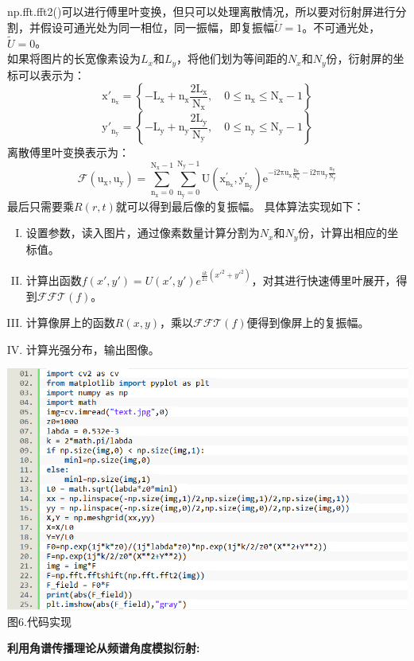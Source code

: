 \documentclass[a4paper,12pt]{article}
\begin{document}
np.fft.fft2()可以进行傅里叶变换，但只可以处理离散情况，所以要对衍射屏进行分割，并假设可通光处为同一相位，同一振幅，即复振幅$\widetilde{U}=1$。不可通光处，$\widetilde{U}=0$。\\
如果将图片的长宽像素设为$L_x$和$L_y$，将他们划为等间距的$N_x$和$N_y$份，衍射屏的坐标可以表示为：
$$\mathrm x'_\mathrm{n_x}=\left\{-\mathrm L_\mathrm{x}+\mathrm n_\mathrm{x}\dfrac{2\mathrm L_\mathrm{x}}{\mathrm N_\mathrm{x}},\quad0\le\mathrm n_\mathrm{x}\le\mathrm N_\mathrm{x}-1\right\}$$
$$\mathrm y'_\mathrm{n_y}=\left\{-\mathrm L_\mathrm{y}+\mathrm n_\mathrm{y}\dfrac{2\mathrm L_\mathrm{y}}{\mathrm N_\mathrm{y}},\quad0\le\mathrm n_\mathrm{y}\le\mathrm N_\mathrm{y}-1\right\}$$
离散傅里叶变换表示为：
$$\mathrm{\mathcal{F}(u_x,u_y)=\sum_{n_x=0}^{N_x-1}\sum_{n_y=0}^{N_y-1}U(x_{n_x}^{\prime},y_{n_y}^{\prime})e^{-i2\pi u_x\frac{n_x}{N_x}-i2\pi u_y\frac{n_y}{N_y}}}$$
最后只需要乘$R(r,t)$就可以得到最后像的复振幅。
\newpage 具体算法实现如下：
\begin{enumerate}[I.]
	\item 设置参数，读入图片，通过像素数量计算分割为$N_x$和$N_y$份，计算出相应的坐标值。
	\item 计算出函数$f(x',y')=U(x',y')e^{\frac{ik}{2z}(x'^2+y'^2)}$，对其进行快速傅里叶展开，得到$\mathcal{FFT}(f)$。
	\item 计算像屏上的函数$R(x,y)$，乘以$\mathcal{FFT}(f)$便得到像屏上的复振幅。
	\item 计算光强分布，输出图像。
\end{enumerate}
\begin{center}
	\includegraphics[scale=1.05]{Pica5.png}\\
	图6.代码实现
\end{center}\vspace{0.2cm}
\noindent\textbf{利用角谱传播理论从频谱角度模拟衍射:}\\
\end{document}

